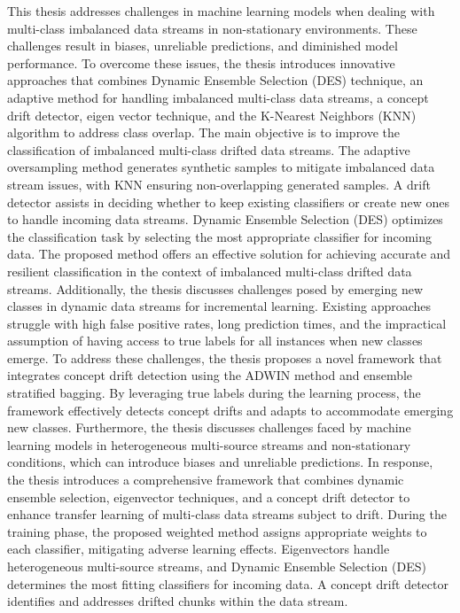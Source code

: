 




\begin{abstracts}        %
    This thesis addresses challenges in machine learning models when dealing with multi-class imbalanced data streams in non-stationary environments. These challenges result in biases, unreliable predictions, and diminished model performance. To overcome these issues, the thesis introduces innovative approaches that combines Dynamic Ensemble Selection (DES) technique, an adaptive method for handling imbalanced multi-class data streams, a concept drift detector, eigen vector technique, and the K-Nearest Neighbors (KNN) algorithm to address class overlap.
    The main objective is to improve the classification of imbalanced multi-class drifted data streams. The adaptive oversampling method generates synthetic samples to mitigate imbalanced data stream issues, with KNN ensuring non-overlapping generated samples. A drift detector assists in deciding whether to keep existing classifiers or create new ones to handle incoming data streams. Dynamic Ensemble Selection (DES) optimizes the classification task by selecting the most appropriate classifier for incoming data. The proposed method offers an effective solution for achieving accurate and resilient classification in the context of imbalanced multi-class drifted data streams. 
    Additionally, the thesis discusses challenges posed by emerging new classes in dynamic data streams for incremental learning. Existing approaches struggle with high false positive rates, long prediction times, and the impractical assumption of having access to true labels for all instances when new classes emerge. To address these challenges, the thesis proposes a novel framework that integrates concept drift detection using the ADWIN method and ensemble stratified bagging. By leveraging true labels during the learning process, the framework effectively detects concept drifts and adapts to accommodate emerging new classes. 
    Furthermore, the thesis discusses challenges faced by machine learning models in heterogeneous multi-source streams and non-stationary conditions, which can introduce biases and unreliable predictions. In response, the thesis introduces a comprehensive framework that combines dynamic ensemble selection, eigenvector techniques, and a concept drift detector to enhance transfer learning of multi-class data streams subject to drift. During the training phase, the proposed weighted method assigns appropriate weights to each classifier, mitigating adverse learning effects. Eigenvectors handle heterogeneous multi-source streams, and Dynamic Ensemble Selection (DES) determines the most fitting classifiers for incoming data. A concept drift detector identifies and addresses drifted chunks within the data stream.

\end{abstracts}
